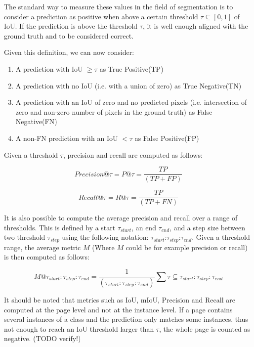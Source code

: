 \documentclass[english, bibtex]{kththesis}
\begin{document}
The standard way to measure these values in the field of segmentation is to consider a prediction as positive when above a certain threshold $\tau \subseteq [0,1]$ of IoU. If the prediction is above the threshold $\tau$, it is well enough aligned with the ground truth and to be considered correct. 

Given this definition, we can now consider:
\begin{enumerate}
\item A prediction with IoU $\geq \tau$ as True Positive(TP)
\item A prediction with no IoU (i.e. with a union of zero) as True Negative(TN)
\item A prediction with an IoU of zero and no predicted pixels (i.e. intersection of zero and non-zero number of pixels in the ground truth) as False Negative(FN)
\item A non-FN prediction with an IoU $< \tau$ as False Positive(FP)
\end{enumerate}

Given a threshold $\tau$, precision and recall are computed as follows:

\begin{equation}
	Precision @ \tau = P@\tau = \frac{TP}{(TP + FP)}
  	\label{eqn:precision}
\end{equation}

\begin{equation}
	Recall @ \tau = R@\tau = \frac{TP}{(TP + FN)}
  	\label{eqn:recall}
\end{equation}

It is also possible to compute the average precision and recall over a range of thresholds. This is defined by a start $\tau_{start}$, an end $\tau_{end}$, and a step size between two threshold $\tau_{step}$ using the following notation: $\tau_{start}$:$\tau_{step}$:$\tau_{end}$. Given a threshold range, the average metric $M$ (Where $M$ could be for example precision or recall) is then computed as follows:

\begin{equation}
M@\tau_{start}:\tau_{step}:\tau_{end} = \frac{1}{(\tau_{start}:\tau_{step}:\tau_{end})} \sum{} \tau \subseteq \tau_{start}:\tau_{step}:\tau_{end}
    \label{eqn:rangem}
\end{equation}

It should be noted that metrics such as IoU, mIoU, Precision and Recall are computed at the page level and not at the instance level. If a page contains several instances of a class and the prediction only matches some instances, thus not enough to reach an IoU threshold larger than $\tau$, the whole page is counted as negative. (TODO verify!)
\end{document}
